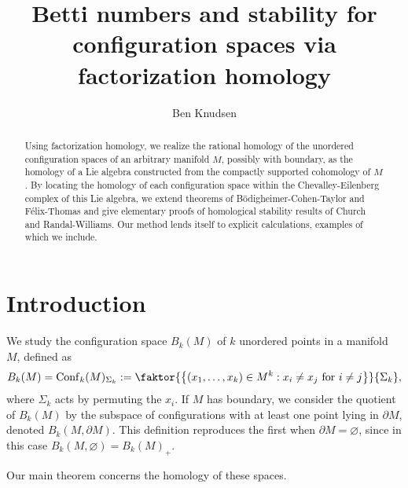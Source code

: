 \documentclass{compositio}
\title[Betti numbers and stability via factorization homology]{Betti numbers and stability for configuration spaces via factorization homology}
\author{Ben Knudsen}
\date{}
\theoremstyle{definition}\newtheorem{definition}{Definition}[section]
\theoremstyle{theorem}\newtheorem{lemma}[definition]{Lemma}
\theoremstyle{remark}\newtheorem*{conventions}{Conventions}
\theoremstyle{remark}\newtheorem*{acknowledgments}{Acknowledgments}
\theoremstyle{remark}\newtheorem*{outline}{Outline}
\theoremstyle{remark}\newtheorem*{questions}{Questions}
\theoremstyle{remark}\newtheorem{example}[definition]{Example}
\theoremstyle{definition}\newtheorem{construction}[definition]{Construction}
\theoremstyle{definition}\newtheorem*{convention}{Convention}
\theoremstyle{definition}\newtheorem*{conjecture}{Conjecture}
\theoremstyle{theorem}\newtheorem{theorem}[definition]{Theorem}
\theoremstyle{theorem}\newtheorem{paradigm}[definition]{Paradigm}
\theoremstyle{remark}\newtheorem{remark}[definition]{Remark}
\theoremstyle{corollary}\newtheorem{corollary}[definition]{Corollary}
\theoremstyle{theorem}\newtheorem{proposition}[definition]{Proposition}
\theoremstyle{definition}\newtheorem{question}[definition]{Question}
\begin{document}

\begin{abstract}
Using factorization homology, we realize the rational homology of the unordered configuration spaces of an arbitrary manifold $M$, possibly with boundary, as the homology of a Lie algebra constructed from the compactly supported cohomology of $M$. By locating the homology of each configuration space within the Chevalley-Eilenberg complex of this Lie algebra, we extend theorems of B\"{o}digheimer-Cohen-Taylor and F\'{e}lix-Thomas and give elementary proofs of homological stability results of Church and Randal-Williams. Our method lends itself to explicit calculations, examples of which we include.
\end{abstract}

\maketitle

\section{Introduction}

We study the configuration space $B_k(M)$ of $k$ unordered points in a manifold $M$, defined as $$B_k(M)={\mathrm{Conf}}_k(M)_{\Sigma_k}:=\faktor{\big\{(x_1,\ldots,x_k)\in M^k:x_i\neq x_j \text{ for } i\neq j\big\}}{\Sigma_k},$$ where $\Sigma_k$ acts by permuting the $x_i$. If $M$ has boundary, we consider the quotient of $B_k(M)$ by the subspace of configurations with at least one point lying in $\partial M$, denoted $B_k(M,\partial M)$. This definition reproduces the first when $\partial M=\varnothing$, since in this case $B_k(M,\varnothing)=B_k(M)_+$. 

Our main theorem concerns the homology of these spaces.
\end{document}
